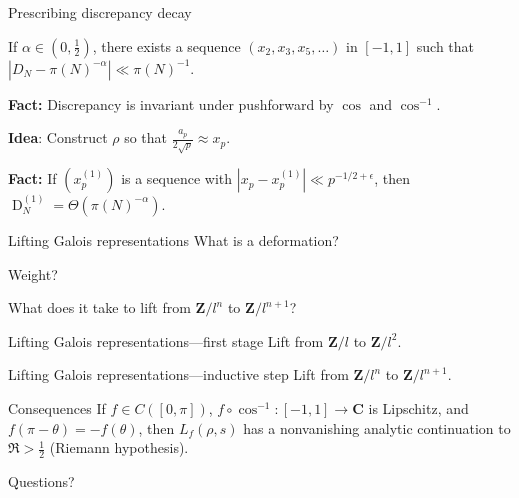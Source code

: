 \documentclass[handout]{beamer}
\DeclareMathOperator{\D}{D}
\newcommand{\bC}{\mathbf{C}}
\newcommand{\bZ}{\mathbf{Z}}
\begin{document}
\begin{frame}{Prescribing discrepancy decay}
\begin{theorem}
If $\alpha\in \left(0,\frac 1 2\right)$, there exists a sequence 
$(x_2,x_3,x_5,\dots)$ in $[-1,1]$ such that 
$| D_N - \pi(N)^{-\alpha}| \ll \pi(N)^{-1}$. 
\end{theorem}
\pause

\textbf{Fact:} 
Discrepancy is invariant under pushforward by $\cos$ and $\cos^{-1}$. 
\pause

\textbf{Idea}:
Construct $\rho$ so that $\frac{a_p}{2\sqrt p}\approx x_p$. 
\pause

\textbf{Fact:} 
If $(x_p^{(1)})$ is a sequence with $|x_p - x_p^{(1)}| \ll p^{-1/2+\epsilon}$, 
then $\D_N^{(1)} = \Theta(\pi(N)^{-\alpha})$. 
\end{frame}


\begin{frame}{Lifting Galois representations}
What is a deformation?

Weight?

What does it take to lift from $\bZ/l^n$ to $\bZ/l^{n+1}$?
\end{frame}


\begin{frame}{Lifting Galois representations---first stage}
Lift from $\bZ/l$ to $\bZ/l^2$. 
\end{frame}


\begin{frame}{Lifting Galois representations---inductive step}
Lift from $\bZ/l^n$ to $\bZ/l^{n+1}$. 
\end{frame}


\begin{frame}{Consequences}
If $f\in C([0,\pi])$, $f\circ \cos^{-1}\colon [-1,1]\to \bC$ is Lipschitz, and 
$f(\pi-\theta) = - f(\theta)$, then $L_f(\rho,s)$ has a nonvanishing analytic 
continuation to $\Re > \frac 1 2$ (Riemann hypothesis). 
\end{frame}





\begin{frame}
\begin{center}
\Huge Questions?
\end{center}
\end{frame}
\end{document}
